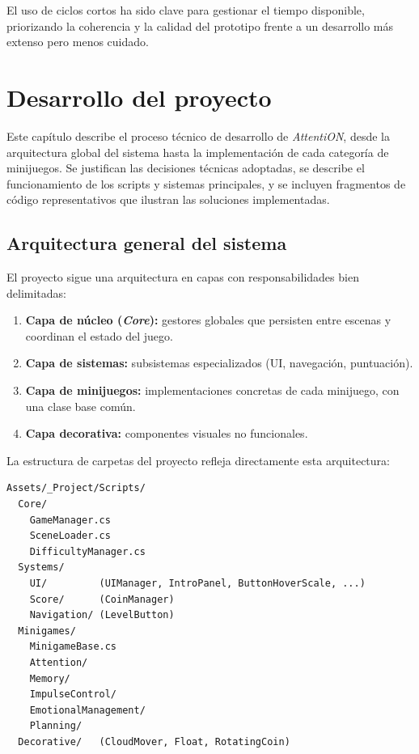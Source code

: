 \documentclass[12pt, a4paper]{report}
\begin{document}
El uso de ciclos cortos ha sido clave para gestionar el tiempo disponible,
priorizando la coherencia y la calidad del prototipo frente a un desarrollo
más extenso pero menos cuidado.

\chapter{Desarrollo del proyecto}

Este capítulo describe el proceso técnico de desarrollo de
\textit{AttentiON}, desde la arquitectura global del sistema hasta la
implementación de cada categoría de minijuegos. Se justifican las decisiones
técnicas adoptadas, se describe el funcionamiento de los scripts y sistemas
principales, y se incluyen fragmentos de código representativos que ilustran
las soluciones implementadas.

\section{Arquitectura general del sistema}

El proyecto sigue una arquitectura en capas con responsabilidades bien
delimitadas:

\begin{enumerate}
  \item \textbf{Capa de núcleo (\textit{Core}):} gestores globales que
    persisten entre escenas y coordinan el estado del juego.
  \item \textbf{Capa de sistemas:} subsistemas especializados (UI, navegación,
    puntuación).
  \item \textbf{Capa de minijuegos:} implementaciones concretas de cada
    minijuego, con una clase base común.
  \item \textbf{Capa decorativa:} componentes visuales no funcionales.
\end{enumerate}

La estructura de carpetas del proyecto refleja directamente esta arquitectura:

\begin{verbatim}
Assets/_Project/Scripts/
  Core/
    GameManager.cs
    SceneLoader.cs
    DifficultyManager.cs
  Systems/
    UI/         (UIManager, IntroPanel, ButtonHoverScale, ...)
    Score/      (CoinManager)
    Navigation/ (LevelButton)
  Minigames/
    MinigameBase.cs
    Attention/
    Memory/
    ImpulseControl/
    EmotionalManagement/
    Planning/
  Decorative/   (CloudMover, Float, RotatingCoin)
\end{verbatim}
\end{document}
